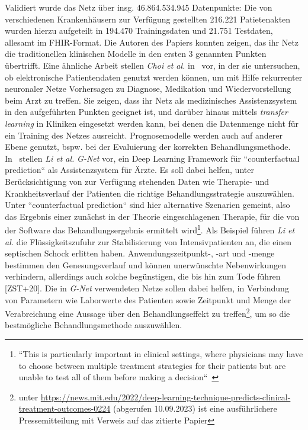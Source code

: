 Validiert wurde das Netz über insg. 46.864.534.945 Datenpunkte: Die von verschiedenen Krankenhäusern zur Verfügung gestellten 216.221 Patietenakten wurden hierzu aufgeteilt in 194.470 Trainingsdaten und 21.751 Testdaten, allesamt im FHIR-Format. Die Autoren des Papiers konnten zeigen, das ihr Netz die traditionellen klinischen Modelle in den ersten 3 genannten Punkten übertrifft. Eine ähnliche Arbeit stellen \textit{Choi et al.} in~\cite{CBS+16} vor, in der sie untersuchen, ob elektronische Patientendaten genutzt werden können, um mit Hilfe rekurrenter neuronaler Netze Vorhersagen zu Diagnose, Medikation und Wiedervorstellung beim Arzt zu treffen. Sie zeigen, dass ihr Netz als medizinisches Assistenzsystem in den aufgeführten Punkten geeignet ist, und darüber hinaus mittels \textit{transfer learning} in Kliniken eingesetzt werden kann, bei denen die Datenmenge nicht für ein Training des Netzes ausreicht.
Prognosemodelle werden auch auf anderer Ebene genutzt, bspw. bei der Evaluierung der korrekten Behandlungsmethode. In~\cite{LHL+21} stellen \textit{Li et al.} \textit{G-Net} vor, ein Deep Learning Framework für ``counterfactual prediction`` als Assistenzsystem für Ärzte. Es soll dabei helfen, unter Berücksichtigung von zur Verfügung stehenden Daten wie Therapie- und Krankheitsverlauf der Patienten die richtige Behandlungsstrategie auszuwählen. Unter ``counterfactual prediction`` sind hier alternative Szenarien gemeint, also das Ergebnis einer zunächst in der Theorie eingeschlagenen Therapie, für die von der Software das Behandlungsergebnis ermittelt wird\footnote{
    ``This is particularly important in clinical settings, where physicians may have to choose between multiple treatment strategies for their patients but are unable to test all of them before making a decision``~\cite[282]{LHL+21}
}. Als Beispiel führen \textit{Li et al.} die Flüssigkeitszufuhr zur Stabilisierung von Intensivpatienten an, die einen septischen Schock erlitten haben. Anwendungszeitpunkt-, -art und -menge bestimmen den Genesungsverlauf und können unerwünschte Nebenwirkungen verhindern, allerdings auch solche begünstigen, die bis hin zum Tode führen [ZST+20]. Die in \textit{G-Net} verwendeten Netze sollen dabei helfen, in Verbindung von Parametern wie Laborwerte des Patienten sowie Zeitpunkt und Menge der Verabreichung eine Aussage über den Behandlungseffekt zu treffen\footnote{
    unter \url{https://news.mit.edu/2022/deep-learning-technique-predicts-clinical-treatment-outcomes-0224} (abgerufen 10.09.2023) ist eine ausführlichere Pressemitteilung mit Verweis auf das zitierte Papier
}, um so die bestmögliche Behandlungsmethode auszuwählen.
